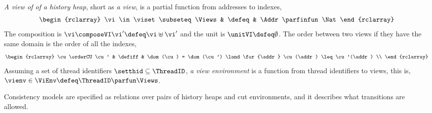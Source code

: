 \begin{defn}[Views]
\label{def:cuts}
\label{def:views}
\emph{A view of of a history heap}, short as \emph{a view}, is a partial function from addresses to indexes,
\[
\begin{rclarray}
    \vi \in \viset \subseteq \Views & \defeq & \Addr \parfinfun \Nat
\end{rclarray}
\]                                                                     
The composition is \( \vi \composeVI \vi' \defeq \vi \uplus \vi'\) and the unit is \( \unitVI \defeq \emptyset\).
The order between two views if they have the same domain is the order of all the indexes, 
\[
\begin{rclarray}
    \cu \orderCU \cu' & \defiff & \dom(\cu) = \dom(\cu') \land \for{\addr} \cu(\addr) \leq \cu'(\addr) \\
\end{rclarray}
\]
Assuming a set of thread identifiers \( \setthid \subseteq \ThreadID \), \emph{a view environment} is a function from thread identifiers to views, this is, \( \vienv \in \ViEnv \defeq \ThreadID \parfun \Views \).
\end{defn}

Consistency models are specified as relations over pairs of history heaps and cut environments, and it describes what transitions are allowed.

